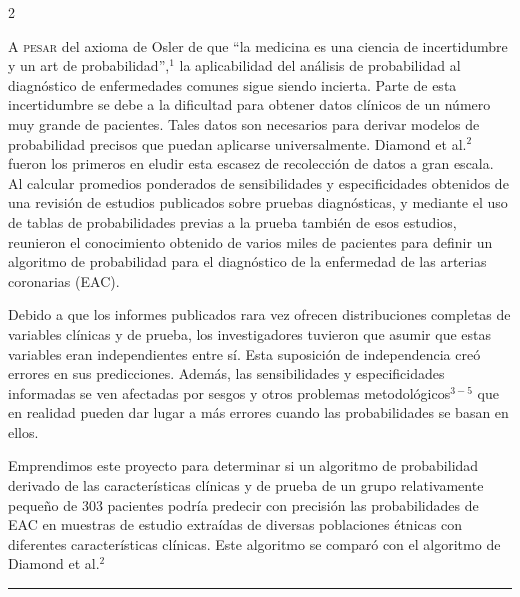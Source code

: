 \documentclass[12pt,letterpaper]{article}
\begin{document}
\begin{multicols}{2}
\columnbreak %

\lettrine{A}{ pesar} del axioma de Osler de que ``la medicina es una ciencia de incertidumbre y un art de probabilidad'',$^1$ la aplicabilidad del análisis de probabilidad al diagnóstico de enfermedades comunes sigue siendo incierta. Parte de esta incertidumbre se debe a la dificultad para obtener datos clínicos de un número muy grande de pacientes. Tales datos son necesarios para derivar modelos de probabilidad precisos que puedan aplicarse universalmente. Diamond et al.$^2$ fueron los primeros en eludir esta escasez de recolección de datos a gran escala. Al calcular promedios ponderados de sensibilidades y especificidades obtenidos de una revisión de estudios publicados sobre pruebas diagnósticas, y mediante el uso de tablas de probabilidades previas a la prueba también de esos estudios, reunieron el conocimiento obtenido de varios miles de pacientes para definir un algoritmo de probabilidad para el diagnóstico de la enfermedad de las arterias coronarias (EAC).

Debido a que los informes publicados rara vez ofrecen distribuciones completas de variables clínicas y de prueba, los investigadores tuvieron que asumir que estas variables eran independientes entre sí. Esta suposición de independencia creó errores en sus predicciones. Además, las sensibilidades y especificidades informadas se ven afectadas por sesgos y otros problemas metodológicos$^{3-5}$ que en realidad pueden dar lugar a más errores cuando las probabilidades se basan en ellos.

Emprendimos este proyecto para determinar si un algoritmo de probabilidad derivado de las características clínicas y de prueba de un grupo relativamente pequeño de 303 pacientes podría predecir con precisión las probabilidades de EAC en muestras de estudio extraídas de diversas poblaciones étnicas con diferentes características clínicas. Este algoritmo se comparó con el algoritmo de Diamond et al.$^2$

\vspace{0cm}
\noindent\rule{\linewidth}{0.4pt}
\vspace{0cm}


\end{multicols}
\end{document}
